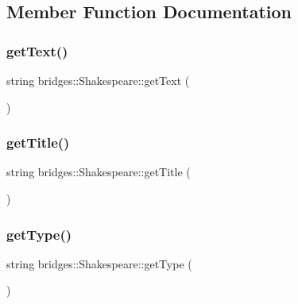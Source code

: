 \subsection{Member Function Documentation}
\hypertarget{classbridges_1_1_shakespeare_a8f43fd74180dd3a5591840b464774b08}{}\label{classbridges_1_1_shakespeare_a8f43fd74180dd3a5591840b464774b08} 
\subsubsection{\texorpdfstring{get\+Text()}{getText()}}
{\footnotesize\ttfamily string bridges\+::\+Shakespeare\+::get\+Text (\begin{DoxyParamCaption}{ }\end{DoxyParamCaption})\hspace{0.3cm}{\ttfamily [inline]}}

\hypertarget{classbridges_1_1_shakespeare_a8729b7dbdddfa4093378268ba90b01cb}{}\label{classbridges_1_1_shakespeare_a8729b7dbdddfa4093378268ba90b01cb} 
\subsubsection{\texorpdfstring{get\+Title()}{getTitle()}}
{\footnotesize\ttfamily string bridges\+::\+Shakespeare\+::get\+Title (\begin{DoxyParamCaption}{ }\end{DoxyParamCaption})\hspace{0.3cm}{\ttfamily [inline]}}

\hypertarget{classbridges_1_1_shakespeare_a556df47f2ed9522d3f4906428af2cf7e}{}\label{classbridges_1_1_shakespeare_a556df47f2ed9522d3f4906428af2cf7e} 
\subsubsection{\texorpdfstring{get\+Type()}{getType()}}
{\footnotesize\ttfamily string bridges\+::\+Shakespeare\+::get\+Type (\begin{DoxyParamCaption}{ }\end{DoxyParamCaption})\hspace{0.3cm}{\ttfamily [inline]}}

